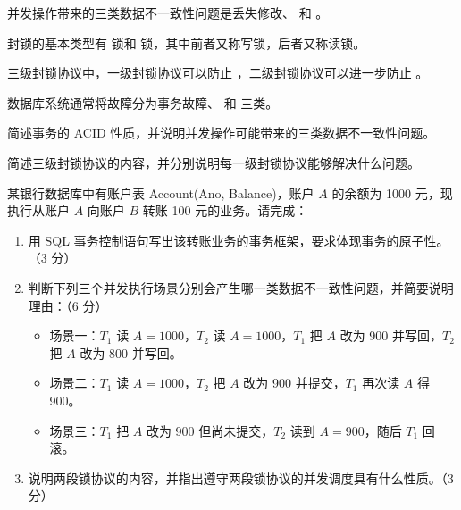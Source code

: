 \documentclass[a4paper,11pt]{article}
\begin{document}
\q 并发操作带来的三类数据不一致性问题是丢失修改、\fillblank{} 和 \fillblank{}。

\q 封锁的基本类型有 \fillblank{} 锁和 \fillblank{} 锁，其中前者又称写锁，后者又称读锁。

\q 三级封锁协议中，一级封锁协议可以防止 \fillblank{}，二级封锁协议可以进一步防止 \fillblank{}。

\q 数据库系统通常将故障分为事务故障、\fillblank{} 和 \fillblank{} 三类。

\q 简述事务的 ACID 性质，并说明并发操作可能带来的三类数据不一致性问题。\anslines{2.2cm}

\q 简述三级封锁协议的内容，并分别说明每一级封锁协议能够解决什么问题。\anslines{2.2cm}

\q 某银行数据库中有账户表 Account(Ano, Balance)，账户 $A$ 的余额为 1000 元，现执行从账户 $A$ 向账户 $B$ 转账 100 元的业务。请完成：
\begin{enumerate}[label=（\arabic*）, leftmargin=2.4em, itemsep=1pt]
  \item 用 SQL 事务控制语句写出该转账业务的事务框架，要求体现事务的原子性。（3 分）
  \item 判断下列三个并发执行场景分别会产生哪一类数据不一致性问题，并简要说明理由：（6 分）
  \begin{itemize}[leftmargin=1.6em, itemsep=1pt]
    \item 场景一：$T_1$ 读 $A=1000$，$T_2$ 读 $A=1000$，$T_1$ 把 $A$ 改为 900 并写回，$T_2$ 把 $A$ 改为 800 并写回。
    \item 场景二：$T_1$ 读 $A=1000$，$T_2$ 把 $A$ 改为 900 并提交，$T_1$ 再次读 $A$ 得 900。
    \item 场景三：$T_1$ 把 $A$ 改为 900 但尚未提交，$T_2$ 读到 $A=900$，随后 $T_1$ 回滚。
  \end{itemize}
  \item 说明两段锁协议的内容，并指出遵守两段锁协议的并发调度具有什么性质。（3 分）
\end{enumerate}
\anslines{4.5cm}
\end{document}
